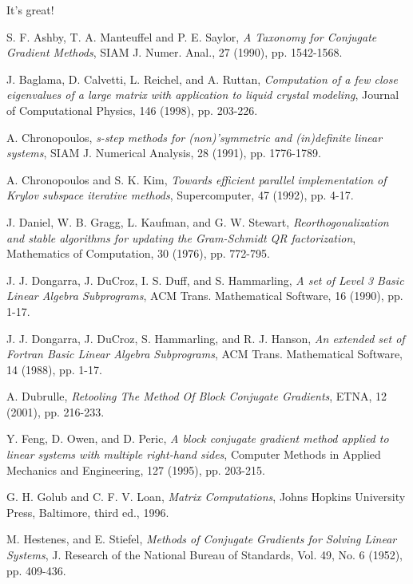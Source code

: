 \documentclass[twoside]{siamltex}
\begin{document}
It's great!

\begin{thebibliography}{AAAA99}

 S. F. Ashby, T. A. Manteuffel and P. E.
Saylor, {\em A Taxonomy for Conjugate Gradient Methods}, SIAM J.
Numer. Anal., 27 (1990), pp. 1542-1568.

 J. Baglama, D. Calvetti, L. Reichel, and A.
Ruttan, {\em Computation of a few close eigenvalues of a large
matrix with application to liquid crystal modeling}, Journal of
Computational Physics, 146 (1998), pp. 203-226.

 A. Chronopoulos, {\em s-step methods for
(non)'symmetric and (in)definite linear systems}, SIAM J.
Numerical Analysis, 28 (1991), pp. 1776-1789.

 A. Chronopoulos and S. K. Kim, {\em Towards
efficient parallel implementation of Krylov subspace iterative
methods}, Supercomputer, 47 (1992), pp. 4-17.

 J. Daniel, W. B. Gragg, L. Kaufman, and G. W.
Stewart, {\em Reorthogonalization and stable algorithms for
updating the Gram-Schmidt QR factorization}, Mathematics of
Computation, 30 (1976), pp. 772-795.

 J. J. Dongarra, J. DuCroz, I. S. Duff, and S.
Hammarling, {\em A set of Level 3 Basic Linear Algebra
Subprograms}, ACM Trans. Mathematical Software, 16 (1990), pp.
1-17.

 J. J. Dongarra, J. DuCroz, S. Hammarling, and
R. J. Hanson, {\em An extended set of Fortran Basic Linear Algebra
Subprograms}, ACM Trans. Mathematical Software, 14 (1988), pp.
1-17.

 A. Dubrulle, {\em Retooling The Method Of
Block Conjugate Gradients}, ETNA, 12 (2001), pp. 216-233.

 Y. Feng, D. Owen, and D. Peric, {\em A
block conjugate gradient method applied to linear systems with
multiple right-hand sides}, Computer Methods in Applied Mechanics
and Engineering, 127 (1995), pp. 203-215.

 G. H. Golub and C. F. V. Loan, {\em Matrix
Computations}, Johns Hopkins University Press, Baltimore, third
ed., 1996.

 M. Hestenes, and E. Stiefel, {\em Methods of
Conjugate Gradients for Solving Linear Systems}, J. Research of
the National Bureau of Standards, Vol. 49, No. 6 (1952), pp.
409-436.


\end{thebibliography}
\end{document}
